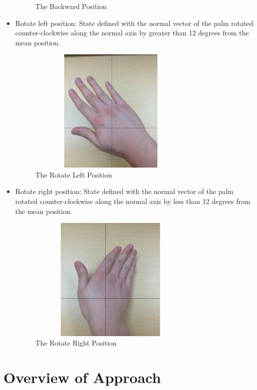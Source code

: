 \documentclass[letterpaper,english, 12pt]{article}
\begin{document}
\begin{itemize}
\begin{figure}[H]
			\caption{The Backward Position}
		\end{figure}
		\item Rotate left position: State defined with the normal vector of the palm rotated counter-clockwise along the normal axis by greater than 12 degrees from the mean position. \\
		\begin{figure}[H]
			\centering
			\includegraphics[height=6cm, width=80mm]{pics/rotateLeft.jpg} 
			\caption{The Rotate Left Position}
		\end{figure}
		\item Rotate right position: State defined with the normal vector of the palm rotated counter-clockwise along the normal axis by less than 12 degrees from the mean position. \\
		\begin{figure}[H]
			\centering
			\includegraphics[height=6cm, width=80mm]{pics/rotateRight.jpg} 
			\caption{The Rotate Right Position}
		\end{figure}
	
\end{itemize}

\section*{Overview of Approach}
\end{document}
